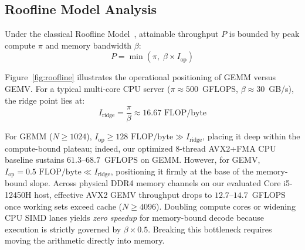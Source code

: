 \documentclass[conference]{IEEEtran}
\begin{document}
\subsection{Roofline Model Analysis}
Under the classical Roofline Model~\cite{williams2009roofline}, attainable throughput $P$ is bounded by peak compute $\pi$ and memory bandwidth $\beta$:
\begin{equation}
    P = \min\left(\pi, \; \beta \times I_{\text{op}}\right)
\end{equation}

Figure~\ref{fig:roofline} illustrates the operational positioning of GEMM versus GEMV. For a typical multi-core CPU server ($\pi \approx 500$~GFLOPS, $\beta \approx 30$~GB/s), the ridge point lies at:
\begin{equation}
    I_{\text{ridge}} = \frac{\pi}{\beta} \approx 16.67\text{ FLOP/byte}
\end{equation}

For GEMM ($N \ge 1024$), $I_{\text{op}} \ge 128\text{ FLOP/byte} \gg I_{\text{ridge}}$, placing it deep within the compute-bound plateau; indeed, our optimized 8-thread AVX2+FMA CPU baseline sustains $61.3\text{--}68.7$~GFLOPS on GEMM. However, for GEMV, $I_{\text{op}} = 0.5\text{ FLOP/byte} \ll I_{\text{ridge}}$, positioning it firmly at the base of the memory-bound slope. Across physical DDR4 memory channels on our evaluated Core i5-12450H host, effective AVX2 GEMV throughput drops to $12.7\text{--}14.7$~GFLOPS once working sets exceed cache ($N \ge 4096$). Doubling compute cores or widening CPU SIMD lanes yields \textit{zero speedup} for memory-bound decode because execution is strictly governed by $\beta \times 0.5$. Breaking this bottleneck requires moving the arithmetic directly into memory.
\end{document}
